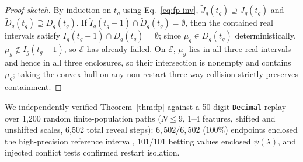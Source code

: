 \begin{proof}[Proof sketch]
By induction on $t_g$ using Eq.~\eqref{eq:fp-inv}, $\tilde{J}_g(t_g) \supseteq J_g(t_g)$ and $\tilde{D}_g(t_g) \supseteq D_g(t_g)$.
If $\tilde{I}_g(t_g-1) \cap \tilde{D}_g(t_g) = \emptyset$, then the contained real intervals satisfy $I_g(t_g-1) \cap D_g(t_g) = \emptyset$; since $\mu_g \in D_g(t_g)$ deterministically, $\mu_g \notin I_g(t_g-1)$, so $\mathcal{E}$ has already failed.
On $\mathcal{E}$, $\mu_g$ lies in all three real intervals and hence in all three enclosures, so their intersection is nonempty and contains $\mu_g$; taking the convex hull on any non-restart three-way collision strictly preserves containment.
\end{proof}

We independently verified Theorem~\ref{thm:fp} against a 50-digit \texttt{Decimal} replay over 1,200 random finite-population paths ($N \le 9$, 1--4 features, shifted and unshifted scales, 6,502 total reveal steps): $6{,}502/6{,}502$ ($100\%$) endpoints enclosed the high-precision reference interval, $101/101$ betting values enclosed $\psi(\lambda)$, and injected conflict tests confirmed restart isolation.

